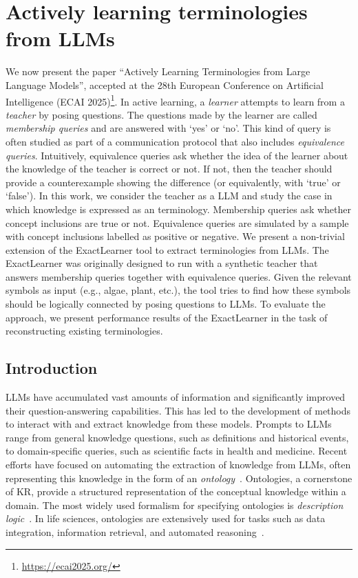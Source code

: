 \section{Actively learning \EL terminologies from \glspl{LLM}}\label{sec:actively-learning-ontologies}
%
We now present the paper ``Actively Learning \EL Terminologies from Large Language Models'', accepted at the 28th European Conference on Artificial Intelligence (ECAI 2025)\footnote{\url{https://ecai2025.org/}}.
%
In active learning, a \emph{learner} attempts to learn from a \emph{teacher} by posing questions.
%
The questions made by the learner are called \emph{membership queries} and are answered with `yes' or `no'.
%
This kind of query is often studied as part of a communication protocol that also includes \emph{equivalence queries}.
%
Intuitively, equivalence queries ask whether the idea of the learner about the knowledge of the teacher is correct or not.
%
If not, then the teacher should provide a counterexample showing the difference (or equivalently, with `true' or `false').
%
In this work, we consider the teacher as a \gls{LLM} and study the case in which knowledge is expressed as an \EL terminology.
%
Membership queries ask whether concept inclusions are true or not.
%
Equivalence queries are simulated by a sample with concept inclusions labelled as  positive or negative.
%
We present a non-trivial extension of the ExactLearner tool to extract \EL terminologies from \glspl{LLM}.
%
The ExactLearner was originally designed to run with a synthetic teacher that answers membership queries together with equivalence queries.
%
Given the relevant symbols as input (e.g., algae, plant, etc.), the tool tries to find how these symbols should be logically connected by posing questions to \glspl{LLM}.
%
To evaluate the approach, we present performance results of the ExactLearner in the task of reconstructing existing \EL terminologies.


\subsection{Introduction}
\label{subsec:actively-learning-introduction}
\glspl{LLM} have accumulated vast amounts of information and significantly improved their question-answering capabilities.
%
This has led to the development of methods to interact with and extract knowledge from these models.
%
Prompts to \glspl{LLM} range from general knowledge questions, such as definitions and historical events, to domain-specific queries, such as scientific facts in health and medicine.
%
Recent efforts have focused on automating the extraction of knowledge from \glspl{LLM}, often representing this knowledge in the form of an \emph{ontology}~\cite{10.1093/bioinformatics/btae104,DBLP:journals/kbs/CiattoAMO25,DBLP:conf/ekaw/DurantiGMRR24,DBLP:conf/kbclm/2023,DBLP:conf/ontobras/SoaresW24}.
%
Ontologies, a cornerstone of \gls{KR}, provide a structured representation of the conceptual knowledge within a domain.
%
The most widely used formalism for specifying ontologies is \emph{description logic}~\cite{DBLP:books/daglib/0041477}.
%
In life sciences, ontologies are extensively used for tasks such as data integration, information retrieval, and automated reasoning~\cite{DBLP:conf/semweb/NoySDDGJMRYM08}.

